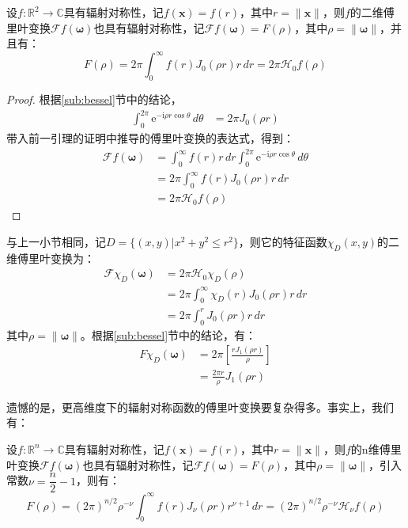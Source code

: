 \documentclass{ctexbook}
\begin{document}
\begin{theorem}
    设$f:\mathbb{R}^2\to\mathbb{C}$具有辐射对称性，记$f(\mathbf{x})=f(r)$，其中$r=\|\mathbf{x}\|$，则$f$的二维傅里叶变换$\mathcal{F} f(\boldsymbol{\omega})$也具有辐射对称性，记$\mathcal{F} f(\boldsymbol{\omega})=F(\rho)$，其中$\rho=\|\boldsymbol{\omega}\|$，并且有：
    \[F(\rho)=2\pi \int_0^{\infty}f(r)J_0(\rho r)r\,dr=2\pi\mathcal{H}_0 f(\rho)\]
\end{theorem}
\begin{proof}
    根据\ref{sub:bessel}节中的结论，\begin{align*}
        \int_{0}^{2\pi}\mathrm{e}^{-\mathrm{i} \rho r \cos\theta}\,d\theta&=2\pi J_0(\rho r)
    \end{align*}
    带入前一引理的证明中推导的傅里叶变换的表达式，得到：
    \begin{align*}
        \mathcal{F} f(\boldsymbol{\omega})&=\int_0^{\infty}f(r)r\,dr\int_0^{2\pi}\mathrm{e}^{-\mathrm{i} \rho r \cos\theta}\,d\theta\\
        &=2\pi \int_0^{\infty}f(r)J_0(\rho r)r\,dr\\
        &=2\pi \mathcal{H} _0 f(\rho)
    \end{align*}
\end{proof}

\begin{example}[圆形特征函数的傅里叶变换]
    与上一小节相同，记$D=\{(x,y)|x^2+y^2\leq r^2\}$，则它的特征函数$\chi_D(x,y)$的二维傅里叶变换为：
    \begin{align*}
        \mathcal{F} \chi_D(\boldsymbol{\omega})&=2\pi\mathcal{H}_0 \chi_D(\rho)\\
        &=2\pi \int_0^{\infty}\chi_D(r)J_0(\rho r)r\,dr\\
        &=2\pi \int_0^{r}J_0(\rho r)r\,dr
    \end{align*}
    其中$\rho=\|\boldsymbol{\omega}\|$。根据\ref{sub:bessel}节中的结论，有：
    \begin{align*}
        F\chi_D(\boldsymbol{\omega})&=2\pi \left[\frac{r J_1(\rho r)}{\rho}\right]\\
        &=\frac{2\pi r}{\rho}J_1(\rho r)
    \end{align*}
\end{example}

遗憾的是，更高维度下的辐射对称函数的傅里叶变换要复杂得多。事实上，我们有：
\begin{claim}
    设$f:\mathbb{R}^n\to\mathbb{C}$具有辐射对称性，记$f(\mathbf{x})=f(r)$，其中$r=\|\mathbf{x}\|$，则$f$的n维傅里叶变换$\mathcal{F} f(\boldsymbol{\omega})$也具有辐射对称性，记$\mathcal{F} f(\boldsymbol{\omega})=F(\rho)$，其中$\rho=\|\boldsymbol{\omega}\|$，引入常数$\nu=\dfrac{n}{2}-1$，则有：
    \[F(\rho)=(2\pi)^{n/2}\rho^{-\nu}\int_0^{\infty}f(r)J_{\nu}(\rho r)r^{\nu+1}\,dr=(2\pi)^{n/2}\rho^{-\nu}\mathcal{H}_\nu f(\rho)\]
\end{claim}
\end{document}
